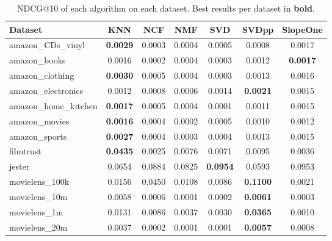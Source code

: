 \begin{table}[t]
\centering
\caption{NDCG@10 of each algorithm on each dataset. Best results per dataset in \textbf{bold}.}
\label{tab:rq1}
\small
\begin{tabular}{lcccccc}
\toprule
Dataset & KNN & NCF & NMF & SVD & SVDpp & SlopeOne \\
\midrule
amazon\_CDs\_vinyl & \textbf{0.0029} & 0.0003 & 0.0004 & 0.0005 & 0.0008 & 0.0017 \\
amazon\_books & 0.0016 & 0.0002 & 0.0004 & 0.0003 & 0.0012 & \textbf{0.0017} \\
amazon\_clothing & \textbf{0.0030} & 0.0005 & 0.0004 & 0.0003 & 0.0013 & 0.0016 \\
amazon\_electronics & 0.0012 & 0.0008 & 0.0006 & 0.0014 & \textbf{0.0021} & 0.0015 \\
amazon\_home\_kitchen & \textbf{0.0017} & 0.0005 & 0.0004 & 0.0001 & 0.0011 & 0.0015 \\
amazon\_movies & \textbf{0.0016} & 0.0004 & 0.0002 & 0.0005 & 0.0010 & 0.0012 \\
amazon\_sports & \textbf{0.0027} & 0.0004 & 0.0003 & 0.0004 & 0.0013 & 0.0015 \\
filmtrust & \textbf{0.0435} & 0.0025 & 0.0076 & 0.0071 & 0.0095 & 0.0036 \\
jester & 0.0654 & 0.0884 & 0.0825 & \textbf{0.0954} & 0.0593 & 0.0953 \\
movielens\_100k & 0.0156 & 0.0450 & 0.0108 & 0.0086 & \textbf{0.1100} & 0.0021 \\
movielens\_10m & 0.0058 & 0.0006 & 0.0001 & 0.0002 & \textbf{0.0061} & 0.0003 \\
movielens\_1m & 0.0131 & 0.0086 & 0.0037 & 0.0030 & \textbf{0.0365} & 0.0010 \\
movielens\_20m & 0.0037 & 0.0002 & 0.0001 & 0.0001 & \textbf{0.0057} & 0.0008 \\
\bottomrule
\end{tabular}
\end{table}